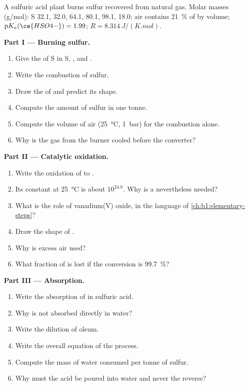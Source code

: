 \begin{problem}
\label{pb:b1:p-block-16-18:1}
A sulfuric acid plant burns sulfur recovered from natural gas. Molar masses
(\unit{g/mol}): S 32.1,  32.0,  64.1,  80.1,
 98.1,  18.0; air contains \qty{21}{\percent} of
 by volume; $\mathrm{p}K_a(\ce{HSO4-}) = 1.99$; $R =
\qty{8.314}{J/(K.mol)}$.

\medskip
\noindent\textbf{Part I --- Burning sulfur.}
\begin{enumerate}
  \item Give the  of S in S, ,  and
        .
  \item Write the combustion of sulfur.
  \item Draw the  of  and predict its shape.
  \item Compute the amount of sulfur in one tonne.
  \item Compute the volume of air (\qty{25}{\celsius}, \qty{1}{bar}) for
        the combustion alone.
  \item Why is the gas from the burner cooled before the converter?
\end{enumerate}

\medskip
\noindent\textbf{Part II --- Catalytic oxidation.}
\begin{enumerate}[resume]
  \item Write the oxidation of  to .
  \item Its constant at \qty{25}{\celsius} is about $10^{24.8}$. Why is a
         nevertheless needed?
  \item What is the role of vanadium(V) oxide, in the language of
        \cref{ch:b1:elementary-steps}?
  \item Draw the shape of .
  \item Why is excess air used?
  \item What fraction of  is lost if the conversion is
        \qty{99.7}{\percent}?
\end{enumerate}

\medskip
\noindent\textbf{Part III --- Absorption.}
\begin{enumerate}[resume]
  \item Write the absorption of  in sulfuric acid.
  \item Why is  not absorbed directly in water?
  \item Write the dilution of oleum.
  \item Write the overall equation of the process.
  \item Compute the mass of water consumed per tonne of sulfur.
  \item Why must the acid be poured into water and never the reverse?
\end{enumerate}


\end{problem}
